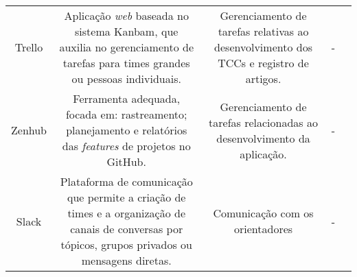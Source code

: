 \begin{table}[]
\begin{tabular}{|c|c|c|c|c}
\begin{minipage} [t] {0.3\textwidth} \centering Trello \cite{trello2011} \end{minipage}                     & \begin{minipage} [t] {0.3\textwidth} \centering  Aplicação \emph{web} baseada no sistema Kanbam, que auxilia no gerenciamento de tarefas para times grandes ou pessoas individuais.   \end{minipage} 	& \begin{minipage} [t] {0.2\textwidth} \centering Gerenciamento de tarefas relativas ao desenvolvimento dos TCCs e registro de artigos. \end{minipage}	 & \begin{minipage} [t] {0.1\textwidth} \centering  - \end{minipage} &  \\ \cline{1-4}
\cellcolor[HTML]{EFEFEF}\begin{minipage} [t] {0.3\textwidth} \centering  Zenhub \cite{zenhub2020} \end{minipage} & \cellcolor[HTML]{EFEFEF}\begin{minipage} [t] {0.3\textwidth} \centering   Ferramenta adequada, focada em: rastreamento; planejamento e relatórios das \emph{features} de projetos no GitHub.   \end{minipage}             & \cellcolor[HTML]{EFEFEF}\begin{minipage} [t] {0.2\textwidth} \centering  Gerenciamento de tarefas relacionadas ao desenvolvimento da aplicação.  \end{minipage}  & \begin{minipage} [t] {0.1\textwidth} \centering  - \end{minipage} &  \\ \cline{1-4}
\begin{minipage} [t] {0.3\textwidth} \centering  Slack \cite{slack2013} \end{minipage}                   & \begin{minipage} [t] {0.3\textwidth} \centering Plataforma de comunicação que permite a criação de times e a organização de canais de conversas por tópicos, grupos privados ou mensagens diretas.  \end{minipage}                & \begin{minipage} [t] {0.2\textwidth} \centering  Comunicação com os orientadores \end{minipage}        & \begin{minipage} [t] {0.1\textwidth} \centering  - \end{minipage} &  \\ \cline{1-4}

\end{tabular}
\end{table}
